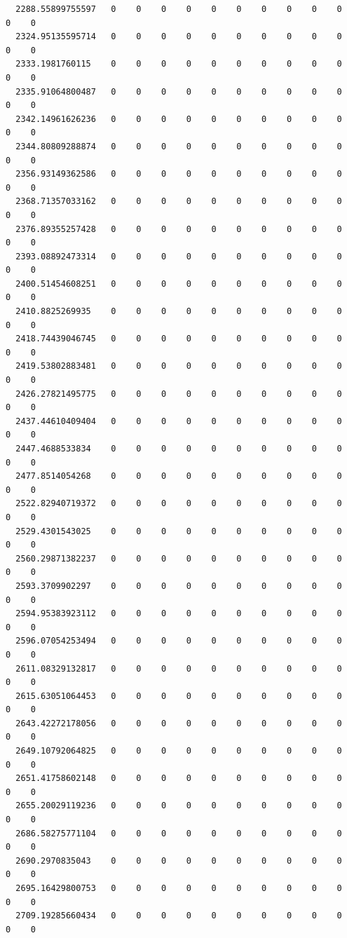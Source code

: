 \documentclass[
  letterpaper,
  DIV=11,
  numbers=noendperiod]{scrartcl}
\begin{document}
\begin{verbatim}
  2288.55899755597   0    0    0    0    0    0    0    0    0    0    0    0
  2324.95135595714   0    0    0    0    0    0    0    0    0    0    0    0
  2333.1981760115    0    0    0    0    0    0    0    0    0    0    0    0
  2335.91064800487   0    0    0    0    0    0    0    0    0    0    0    0
  2342.14961626236   0    0    0    0    0    0    0    0    0    0    0    0
  2344.80809288874   0    0    0    0    0    0    0    0    0    0    0    0
  2356.93149362586   0    0    0    0    0    0    0    0    0    0    0    0
  2368.71357033162   0    0    0    0    0    0    0    0    0    0    0    0
  2376.89355257428   0    0    0    0    0    0    0    0    0    0    0    0
  2393.08892473314   0    0    0    0    0    0    0    0    0    0    0    0
  2400.51454608251   0    0    0    0    0    0    0    0    0    0    0    0
  2410.8825269935    0    0    0    0    0    0    0    0    0    0    0    0
  2418.74439046745   0    0    0    0    0    0    0    0    0    0    0    0
  2419.53802883481   0    0    0    0    0    0    0    0    0    0    0    0
  2426.27821495775   0    0    0    0    0    0    0    0    0    0    0    0
  2437.44610409404   0    0    0    0    0    0    0    0    0    0    0    0
  2447.4688533834    0    0    0    0    0    0    0    0    0    0    0    0
  2477.8514054268    0    0    0    0    0    0    0    0    0    0    0    0
  2522.82940719372   0    0    0    0    0    0    0    0    0    0    0    0
  2529.4301543025    0    0    0    0    0    0    0    0    0    0    0    0
  2560.29871382237   0    0    0    0    0    0    0    0    0    0    0    0
  2593.3709902297    0    0    0    0    0    0    0    0    0    0    0    0
  2594.95383923112   0    0    0    0    0    0    0    0    0    0    0    0
  2596.07054253494   0    0    0    0    0    0    0    0    0    0    0    0
  2611.08329132817   0    0    0    0    0    0    0    0    0    0    0    0
  2615.63051064453   0    0    0    0    0    0    0    0    0    0    0    0
  2643.42272178056   0    0    0    0    0    0    0    0    0    0    0    0
  2649.10792064825   0    0    0    0    0    0    0    0    0    0    0    0
  2651.41758602148   0    0    0    0    0    0    0    0    0    0    0    0
  2655.20029119236   0    0    0    0    0    0    0    0    0    0    0    0
  2686.58275771104   0    0    0    0    0    0    0    0    0    0    0    0
  2690.2970835043    0    0    0    0    0    0    0    0    0    0    0    0
  2695.16429800753   0    0    0    0    0    0    0    0    0    0    0    0
  2709.19285660434   0    0    0    0    0    0    0    0    0    0    0    0

\end{verbatim}
\end{document}
